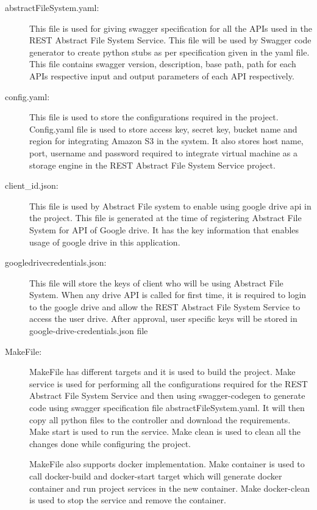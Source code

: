 \begin{description}



\item[abstractFileSystem.yaml:] This file is used for giving swagger
  specification for all the APIs used in the REST Abstract File System
  Service. This file will be used by Swagger code generator to create
  python stubs as per specification given in the yaml file.  This file
  contains swagger version, description, base path, path for each APIs
  respective input and output parameters of each API respectively.

\item[config.yaml:] This file is used to store the configurations
  required in the project.  Config.yaml file is used to store access
  key, secret key, bucket name and region for integrating Amazon S3 in
  the system. It also stores host name, port, username and password
  required to integrate virtual machine as a storage engine in the
  REST Abstract File System Service project.

\item[client\_id.json:] This file is used by Abstract File system to
  enable using google drive api in the project. This file is generated
  at the time of registering Abstract File System for API of Google
  drive. It has the key information that enables usage of google drive
  in this application.

\item[google\-drive\-credentials.json:] This file will store the keys
  of client who will be using Abstract File System. When any drive API
  is called for first time, it is required to login to the google
  drive and allow the REST Abstract File System Service to access the
  user drive.  After approval, user specific keys will be stored in
  google-drive-credentials.json file

\item[MakeFile:] MakeFile has different targets and it is used to
  build the project.  Make service is used for performing all the
  configurations required for the REST Abstract File System Service
  and then using swagger-codegen to generate code using swagger
  specification file abstractFileSystem.yaml. It will then copy all
  python files to the controller and download the requirements. Make
  start is used to run the service. Make clean is used to clean all
  the changes done while configuring the project.


  MakeFile also supports docker implementation. Make container is used
  to call docker-build and docker-start target which will generate
  docker container and run project services in the new container. Make
  docker-clean is used to stop the service and remove the container.


\end{description}
